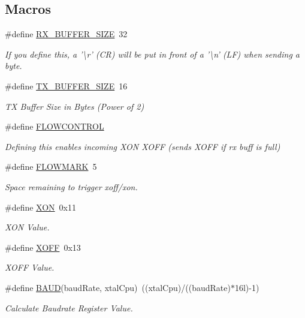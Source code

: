 \subsection*{Macros}
\begin{DoxyCompactItemize}
\item 
\#define \hyperlink{group__uart_ga739a2a1a0047c98ac1b18ecd25dac092}{R\-X\-\_\-\-B\-U\-F\-F\-E\-R\-\_\-\-S\-I\-Z\-E}~32
\begin{DoxyCompactList}\small\item\em If you define this, a '\textbackslash{}r' (C\-R) will be put in front of a '\textbackslash{}n' (L\-F) when sending a byte. \end{DoxyCompactList}\item 
\#define \hyperlink{group__uart_ga9ab33647617098646990fe263600b650}{T\-X\-\_\-\-B\-U\-F\-F\-E\-R\-\_\-\-S\-I\-Z\-E}~16
\begin{DoxyCompactList}\small\item\em T\-X Buffer Size in Bytes (Power of 2) \end{DoxyCompactList}\item 
\#define \hyperlink{group__uart_gaff1f07741fbe1f53f46098687f0a05e2}{F\-L\-O\-W\-C\-O\-N\-T\-R\-O\-L}
\begin{DoxyCompactList}\small\item\em Defining this enables incoming X\-O\-N X\-O\-F\-F (sends X\-O\-F\-F if rx buff is full) \end{DoxyCompactList}\item 
\#define \hyperlink{group__uart_gaa7907a070ef8e6d68d7d774b34eebe66}{F\-L\-O\-W\-M\-A\-R\-K}~5
\begin{DoxyCompactList}\small\item\em Space remaining to trigger xoff/xon. \end{DoxyCompactList}\item 
\#define \hyperlink{group__uart_gacdf721774c51e08c6609e6fa8cf82cc9}{X\-O\-N}~0x11
\begin{DoxyCompactList}\small\item\em X\-O\-N Value. \end{DoxyCompactList}\item 
\#define \hyperlink{group__uart_ga67fd78ae15d2b67c10d44d69a49ab1c5}{X\-O\-F\-F}~0x13
\begin{DoxyCompactList}\small\item\em X\-O\-F\-F Value. \end{DoxyCompactList}\item 
\#define \hyperlink{group__uart_gafccfd7d1315f0763ac404c6104883341}{B\-A\-U\-D}(baud\-Rate, xtal\-Cpu)~((xtal\-Cpu)/((baud\-Rate)$\ast$16l)-\/1)
\begin{DoxyCompactList}\small\item\em Calculate Baudrate Register Value. \end{DoxyCompactList}\end{DoxyCompactItemize}
